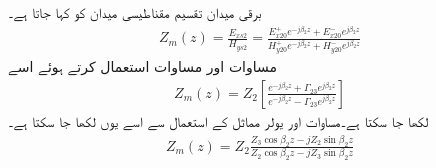 برقی میدان تقسیم مقناطیسی  میدان کو   کہا جاتا ہے۔ 
\begin{align}
Z_m(z)=\frac{E_{xs2}}{H_{ys2}}=\frac{E_{x20}^+ e^{-j\beta_2 z}+E_{x20}^- e^{j \beta_2 z}}{H_{y20}^+ e^{-j\beta_2 z}+H_{y20}^- e^{j \beta_2 z}}
\end{align}
مساوات  اور مساوات  استعمال کرتے ہوئے اسے
\begin{align}
Z_m(z)=Z_2 \left[\frac{e^{-j \beta_2 z}+\Gamma_{23} e^{j \beta_2 z}}{e^{-j \beta_2 z}-\Gamma_{23} e^{j \beta_2 z}} \right]
\end{align}
لکھا جا سکتا ہے۔مساوات  اور یولر مماثل کے استعمال سے اسے یوں لکھا جا سکتا ہے۔
\begin{align}\label{مساوات_مستوی_موج_کی_رکاوٹ}
Z_m(z)=Z_2 \frac{Z_3 \cos \beta_2 z - j Z_2 \sin \beta_2 z}{Z_2 \cos \beta_2 z - j Z_3 \sin \beta_2 z}
\end{align}

